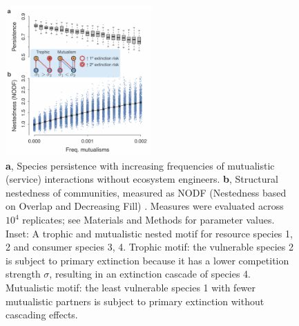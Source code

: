 \documentclass[twocolumn,preprintnumbers,amsmath,amssymb,superscriptaddress,linenumbers]{revtex4-1}
\begin{document}
\begin{figure}[h!]
\centering
\includegraphics[width=0.5\textwidth]{fig_nested.png}
\vspace{0mm}
\caption{
\textbf{a}, Species persistence with increasing frequencies of mutualistic (service) interactions without ecosystem engineers.
\textbf{b}, Structural nestedness of communities, measured as NODF (Nestedness based on Overlap and Decreasing Fill) \cite{AlmeidaNeto2008}.
Measures were evaluated across $10^4$ replicates; see Materials and Methods for parameter values.
Inset: A trophic and mutualistic nested motif for resource species 1, 2 and consumer species 3, 4.
Trophic motif: the vulnerable species 2 is subject to primary extinction because it has a lower competition strength $\sigma$, resulting in an extinction cascade of species 4.
Mutualistic motif: the least vulnerable species 1 with fewer mutualistic partners is subject to primary extinction without cascading effects.
\vspace{0mm}
}
\label{fig:nest}
\end{figure}
\end{document}
